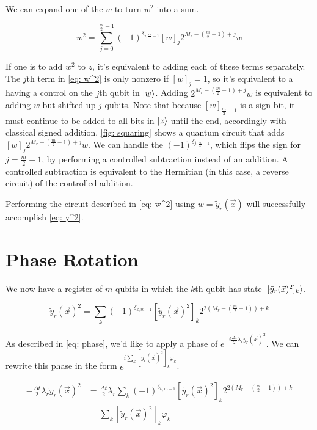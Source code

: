 We can expand one of the $w$ to turn $w^2$ into a sum.

\begin{equation}
    w^2 = \sum_{j = 0}^{\frac{m}{2} - 1} (-1)^{\delta_{j, \frac{m}{2} - 1}}[w]_j2^{M_r - (\frac{m}{2} - 1) + j}w \label{eq: w^2}
\end{equation}

If one is to add $w^2$ to $z$, it's equivalent to adding each of these terms separately. The $j$th term in \eqref{eq: w^2} is only nonzero if $[w]_j = 1$, so it's equivalent to a having a control on the $j$th qubit in $\ket{w}$. Adding $2^{M_r - (\frac{m}{2} - 1) + j}w$ is equivalent to adding $w$ but shifted up $j$ qubits. Note that because $[w]_{\frac{m}{2} - 1}$ is a sign bit, it must continue to be added to all bits in $\ket{z}$ until the end, accordingly with classical signed addition. \ref{fig: squaring} shows a quantum circuit that adds $[w]_j2^{M_r - (\frac{m}{2} - 1) + j}w$.
We can handle the $(-1)^{\delta_{j, \frac{m}{2} - 1}}$, which flips the sign for $j = \frac{m}{2} - 1$, by performing a controlled subtraction instead of an addition. A controlled subtraction is equivalent to the Hermitian (in this case, a reverse circuit) of the controlled addition.

Performing the circuit described in \ref{eq: w^2} using $w = \tilde{y}_r(\vec{x})$ will successfully accomplish \ref{eq: y^2}.

\section{Phase Rotation}

We now have a register of $m$ qubits in which the $k$th qubit has state $\ket{[\tilde{y}_r(\vec{x})^2]_k}$.

\begin{equation}
    \tilde{y}_r(\vec{x})^2 = \sum_k (-1)^{\delta_{k, m - 1}}[\tilde{y}_r(\vec{x})^2]_k2^{2(M_r - (\frac{m}{2} - 1)) + k}
\end{equation}

As described in \eqref{eq: phase}, we'd like to apply a phase of $e^{-i\frac{\Delta t}{2}\lambda_r\tilde{y}_r(\vec{x})^2}$. We can rewrite this phase in the form $e^{i\sum_k [\tilde{y}_r(\vec{x})^2]_k\varphi_k}$.


\begin{equation}
    \begin{split}
        -\frac{\Delta t}{2}\lambda_r\tilde{y}_r(\vec{x})^2 &= \frac{\Delta t}{2}\lambda_r\sum_k (-1)^{\delta_{k, m - 1}}[\tilde{y}_r(\vec{x})^2]_k2^{2(M_r - (\frac{m}{2} - 1)) + k} \\
        &= \sum_k [\tilde{y}_r(\vec{x})^2]_k\varphi_k
    \end{split}
\end{equation}

